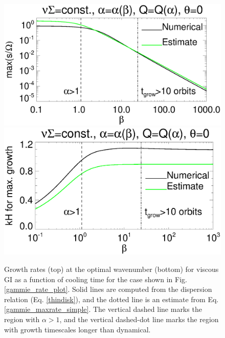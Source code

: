 \begin{figure}
  \includegraphics[width=\linewidth,clip=true,trim=0cm 2cm 0.cm
    0.0cm]{figures/result2d_gvisc}
  \includegraphics[width=\linewidth,clip=true,trim=0cm 0cm 0.cm
    1.0cm]{figures/result2d_gvisc_kmax}
  \caption{Growth rates (top) at the optimal wavenumber (bottom) for
    viscous GI as a function of cooling time for the
    case shown in Fig. \ref{gammie_rate_plot}. Solid lines are
    computed from the dispersion relation (Eq. \ref{thindisk}), and the dotted line is an
    estimate from Eq. \ref{gammie_maxrate_simple}. The vertical dashed
    line marks the region with $\alpha > 1$, and the vertical
    dashed-dot line marks the region with growth timescales longer
    than dynamical. 
    \label{gammie_maxrate_plot}}
\end{figure}
